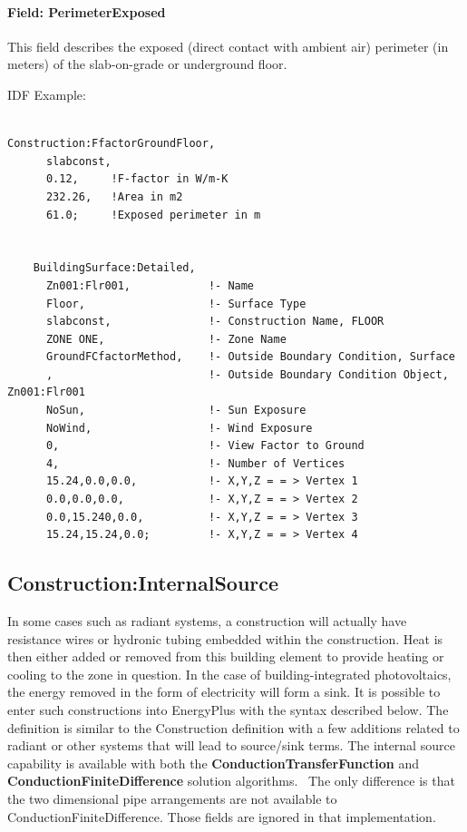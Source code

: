 \paragraph{Field: PerimeterExposed}\label{field-perimeterexposed}

This field describes the exposed (direct contact with ambient air) perimeter (in meters) of the slab-on-grade or underground floor.

IDF Example:

\begin{lstlisting}

Construction:FfactorGroundFloor,
      slabconst,
      0.12,     !F-factor in W/m-K
      232.26,   !Area in m2
      61.0;     !Exposed perimeter in m


    BuildingSurface:Detailed,
      Zn001:Flr001,            !- Name
      Floor,                   !- Surface Type
      slabconst,               !- Construction Name, FLOOR
      ZONE ONE,                !- Zone Name
      GroundFCfactorMethod,    !- Outside Boundary Condition, Surface
      ,                        !- Outside Boundary Condition Object, Zn001:Flr001
      NoSun,                   !- Sun Exposure
      NoWind,                  !- Wind Exposure
      0,                       !- View Factor to Ground
      4,                       !- Number of Vertices
      15.24,0.0,0.0,           !- X,Y,Z = = > Vertex 1
      0.0,0.0,0.0,             !- X,Y,Z = = > Vertex 2
      0.0,15.240,0.0,          !- X,Y,Z = = > Vertex 3
      15.24,15.24,0.0;         !- X,Y,Z = = > Vertex 4
\end{lstlisting}

\subsection{Construction:InternalSource}\label{constructioninternalsource}

In some cases such as radiant systems, a construction will actually have resistance wires or hydronic tubing embedded within the construction. Heat is then either added or removed from this building element to provide heating or cooling to the zone in question. In the case of building-integrated photovoltaics, the energy removed in the form of electricity will form a sink. It is possible to enter such constructions into EnergyPlus with the syntax described below. The definition is similar to the Construction definition with a few additions related to radiant or other systems that will lead to source/sink terms. The internal source capability is available with both the \textbf{ConductionTransferFunction} and \textbf{ConductionFiniteDifference} solution algorithms.~ The only difference is that the two dimensional pipe arrangements are not available to ConductionFiniteDifference. Those fields are ignored in that implementation.

